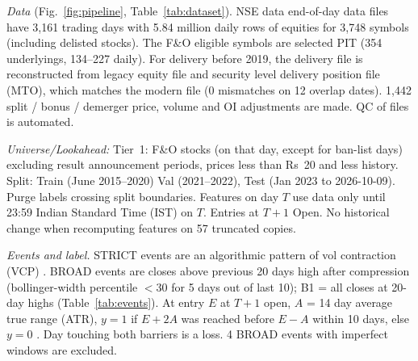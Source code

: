 \documentclass[conference]{IEEEtran}
\begin{document}
\emph{Data} (Fig.~\ref{fig:pipeline}, Table~\ref{tab:dataset}). NSE data end-of-day data files have 3,161
trading days with 5.84 million daily rows of equities for 3,748 symbols (including delisted stocks). The F\&O
eligible symbols are selected PIT (354 underlyings, 134--227 daily). For delivery before 2019, the delivery file
is reconstructed from legacy equity file and security level delivery position file (MTO), which matches the
modern file (0 mismatches on 12 overlap dates). 1,442 split / bonus / demerger price, volume and OI adjustments
are made. QC of files is automated.

\emph{Universe/Lookahead:} Tier~1: F\&O stocks (on that day, except for ban-list days) excluding result
announcement periods, prices less than Rs~20 and less history. Split: Train (June 2015--2020) Val (2021--2022),
Test (Jan 2023 to 2026-10-09). Purge labels crossing split boundaries. Features on day $T$ use data only until
23:59 Indian Standard Time (IST) on $T$. Entries at $T+1$ Open. No historical change when recomputing features
on 57 truncated copies.

\emph{Events and label.} STRICT events are an algorithmic pattern of vol contraction (VCP)
\cite{minervini2013}. BROAD events are closes above previous 20 days high after compression (bollinger-width
percentile $<$30 for 5 days out of last 10); B1 = all closes at 20-day highs (Table~\ref{tab:events}). At entry
$E$ at $T+1$ open, $A$ = 14 day average true range (ATR), $y=1$ if $E+2A$ was reached before $E-A$ within 10
days, else $y=0$ \cite{lopezdeprado2018}. Day touching both barriers is a loss. 4 BROAD events with imperfect
windows are excluded.
\end{document}
